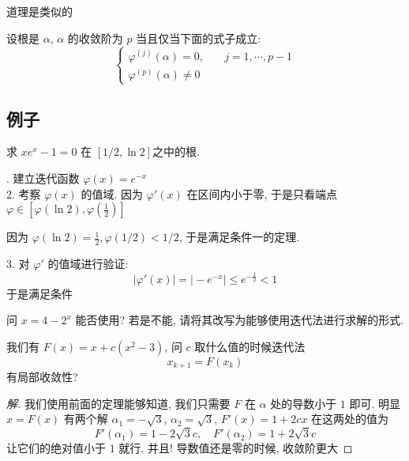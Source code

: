 \begin{frame}
	\begin{thm}[局部收敛性]
		道理是类似的
	\end{thm}
	\begin{thm}[重根]
		设根是 \(\alpha\), \(\alpha\) 的收敛阶为 \(p\) 当且仅当下面的式子成立:
		\[
			\begin{cases}
			\varphi^{(j)} (\alpha) = 0 , \quad & j = 1 , \cdots , p - 1 \\
			\varphi ^{(p)} (\alpha) \ne 0
			\end{cases}
		\]
	\end{thm}
\end{frame}

\subsection{例子}
\begin{frame}
求 \( x e ^{x} - 1 = 0\) 在 \([ 1/2 , \ln 2]\)之中的根.

. 建立迭代函数 \( \varphi (x) =  e^{-x}\)\\
2. 考察 \( \varphi(x)\) 的值域. 因为 \( \varphi'(x)\) 在区间内小于零, 于是只看端点 \(\varphi \in [ \varphi (\ln 2) , \varphi(\frac12) ]\)

因为 \( \varphi (\ln 2) = \frac 12, \varphi (1/2) < 1/2\), 于是满足条件一的定理.

3. 对 \( \varphi'\) 的值域进行验证:
\[
\vert \varphi'(x) \vert =\vert - e^{-x} \vert \le e^{- \frac12} < 1
\]
于是满足条件
\end{frame}

\begin{frame}
问 \(x = 4 - 2 ^{x}\) 能否使用? 若是不能, 请将其改写为能够使用迭代法进行求解的形式.
\end{frame}

\begin{frame}
我们有 \(F (x) = x + c ( x^{2} - 3)\), 问 \(c\) 取什么值的时候迭代法 \[x_{k+1} = F (x_{k}) \] 有局部收敛性?
\begin{proof}[解]
我们使用前面的定理能够知道, 我们只需要 \(F\) 在 \(\alpha\) 处的导数小于 \(1\) 即可. 明显 \(x = F(x)\) 有两个解 \(\alpha _{1} = - \sqrt 3\), \(\alpha _{2} = \sqrt 3\), \(F ' (x) = 1 + 2 cx\) 在这两处的值为
\[
F'(\alpha_1) = 1 - 2 \sqrt 3 c , \quad F '(\alpha_{2})  = 1  + 2 \sqrt 3 c
\]
让它们的绝对值小于 \(1\) 就行. 并且! 导数值还是零的时候, 收敛阶更大
\end{proof}
\end{frame}
